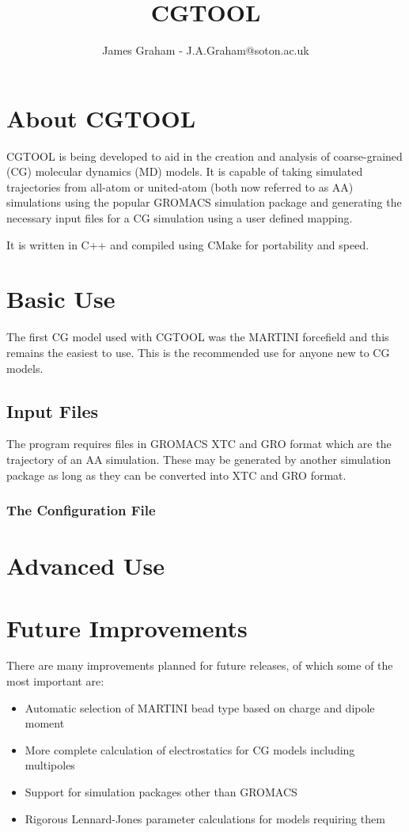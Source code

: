 \documentclass[10pt]{article}
\begin{document}
\title{CGTOOL}
\author{James Graham - J.A.Graham@soton.ac.uk}

\maketitle

\tableofcontents

\pagebreak

\section{About CGTOOL}
CGTOOL is being developed to aid in the creation and analysis of coarse-grained (CG) molecular dynamics (MD) models.  It is capable of taking simulated trajectories from all-atom or united-atom (both now referred to as AA) simulations using the popular GROMACS simulation package and generating the necessary input files for a CG simulation using a user defined mapping.

It is written in C++ and compiled using CMake for portability and speed.

\section{Basic Use}
The first CG model used with CGTOOL was the MARTINI forcefield and this remains the easiest to use.  This is the recommended use for anyone new to CG models.

\subsection{Input Files}
The program requires files in GROMACS XTC and GRO format which are the trajectory of an AA simulation.  These may be generated by another simulation package as long as they can be converted into XTC and GRO format.

\subsubsection{The Configuration File}


\section{Advanced Use}

\section{Future Improvements}
There are many improvements planned for future releases, of which some of the most important are:
\begin{itemize}
\item Automatic selection of MARTINI bead type based on charge and dipole moment
\item More complete calculation of electrostatics for CG models including multipoles
\item Support for simulation packages other than GROMACS
\item Rigorous Lennard-Jones parameter calculations for models requiring them
\end{itemize}
\end{document}
